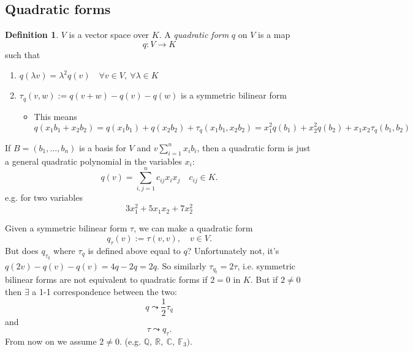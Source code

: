 \documentclass[a4paper]{article}
\theoremstyle{definition}
\newtheorem{defn}{Definition}[subsection]
\begin{document}
\subsection{Quadratic forms}
\begin{defn}
$V$ is a vector space over $K$. A \textit{quadratic form} $q$ on $V$ is a map
\[
q:V\rightarrow K
\]
such that \begin{enumerate}
    \item $q(\lambda v) = \lambda ^2 q (v) \quad \forall v\in V,\ \forall \lambda \in K$ 
    \item $\tau_q (v,w) := q(v+w)-q(v)-q(w)$ is a symmetric bilinear form \begin{itemize}
        \item This means $q(x_1b_1+x_2b_2)=q(x_1b_1)+q(x_2b_2)+\tau_q (x_1b_1,x_2b_2)=x_1^2 q(b_1)+x_2^2 q(b_2)+x_1x_2 \tau_q (b_1,b_2)$
    \end{itemize}
\end{enumerate}
\end{defn}
If $B=(b_1,\ldots,b_n)$ is a basis for $V$ and $v\sum_{i=1}^n x_i b_i$, then a quadratic form is just a general quadratic polynomial in the variables $x_i$:
\[
q(v)=\sum_{i,j=1}^n c_{ij} x_i x_j\quad c_{ij}\in K.
\]
e.g. for two variables
\[
3x_1^2+5x_1x_2+7x_2^2
\]

Given a symmetric bilinear form $\tau$, we can make a quadratic form
\[
q_\tau (v) :=\tau (v,v),\quad v\in V.
\]
But does $q_{\tau_q}$ where $\tau_q$ is defined above equal to $q$? Unfortunately not, it's $q(2v)-q(v)-q(v)=4q-2q=2q$. So similarly $\tau_{q_t}=2\tau$, i.e. symmetric bilinear forms are not equivalent to quadratic forms if $2=0$ in $K$. But if $2\neq 0$ then $\exists$ a 1-1 correspondence between the two:
\[
q\leadsto \frac12 \tau_q
\]
and
\[
\tau \leadsto q_\tau .
\]
From now on we assume $2\neq 0$. (e.g. $\mathbb Q,\ \mathbb R,\ \mathbb C,\ \mathbb F_3 )$.
\end{document}
